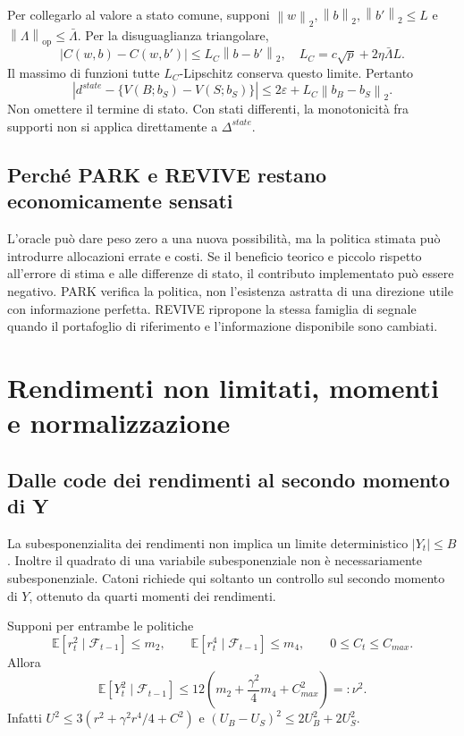 \documentclass[11pt,a4paper]{article}
\theoremstyle{definition}\newtheorem{definition}[theorem]{Definizione}
\theoremstyle{remark}\newtheorem{remark}[theorem]{Osservazione}
\newcommand{\E}{\mathbb E}\newcommand{\PP}{\mathbb P}\newcommand{\R}{\mathbb R}
\newcommand{\F}{\mathcal F}\newcommand{\W}{\mathcal W}\newcommand{\supp}{\operatorname{supp}}
\newcommand{\op}{\mathrm{op}}\newcommand{\ind}{\mathbf 1}\newcommand{\pos}[1]{\left[#1\right]_+}
\newcommand{\norm}[1]{\left\lVert#1\right\rVert}\newcommand{\abs}[1]{\left|#1\right|}
\begin{document}
Per collegarlo al valore a stato comune, supponi $\norm w_2,\norm b_2,\norm{b'}_2\le L$ e $\norm\Lambda_\op\le\bar\Lambda$. Per la disuguaglianza triangolare,
\begin{equation}
 |C(w,b)-C(w,b')|\le L_C\norm{b-b'}_2,
 \quad L_C=c\sqrt p+2\eta\bar\Lambda L.
\end{equation}
Il massimo di funzioni tutte $L_C$-Lipschitz conserva questo limite. Pertanto
\begin{equation}
 |d^{state}-\{V(B;b_S)-V(S;b_S)\}|
 \le2\varepsilon+L_C\norm{b_B-b_S}_2.\label{eq:statebridge}
\end{equation}
Non omettere il termine di stato. Con stati differenti, la monotonicità fra supporti non si applica direttamente a $\Delta^{state}$.

\subsection{Perché PARK e REVIVE restano economicamente sensati}
L'oracle può dare peso zero a una nuova possibilità, ma la politica stimata può introdurre allocazioni errate e costi. Se il beneficio teorico e piccolo rispetto all'errore di stima e alle differenze di stato, il contributo implementato può essere negativo. PARK verifica la politica, non l'esistenza astratta di una direzione utile con informazione perfetta. REVIVE ripropone la stessa famiglia di segnale quando il portafoglio di riferimento e l'informazione disponibile sono cambiati.

\section{Rendimenti non limitati, momenti e normalizzazione}
\label{sec:moments}
\subsection{Dalle code dei rendimenti al secondo momento di Y}
La subesponenzialita dei rendimenti non implica un limite deterministico $|Y_t|\le B$. Inoltre il quadrato di una variabile subesponenziale non è necessariamente subesponenziale. Catoni richiede qui soltanto un controllo sul secondo momento di $Y$, ottenuto da quarti momenti dei rendimenti.

Supponi per entrambe le politiche
\begin{equation}
 \E[r_t^2\mid\F_{t-1}]\le m_2,\qquad
 \E[r_t^4\mid\F_{t-1}]\le m_4,\qquad 0\le C_t\le C_{max}.
\end{equation}
Allora
\begin{equation}
 \E[Y_t^2\mid\F_{t-1}]
 \le12\left(m_2+\frac{\gamma^2}{4}m_4+C_{max}^2\right)=:\nu^2.\label{eq:numoment}
\end{equation}
Infatti $U^2\le3(r^2+\gamma^2r^4/4+C^2)$ e $(U_B-U_S)^2\le2U_B^2+2U_S^2$.
\end{document}
